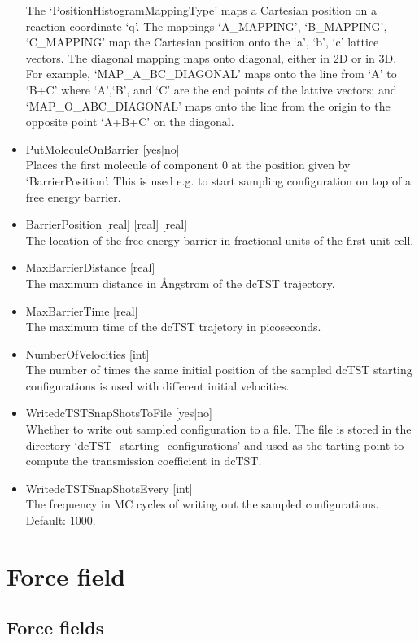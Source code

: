 \begin{itemize}
The `PositionHistogramMappingType' maps a Cartesian position on a reaction coordinate `q'.
The mappings `A\_MAPPING', `B\_MAPPING', `C\_MAPPING' map the Cartesian position onto the `a', `b', `c' lattice vectors.
The diagonal mapping maps onto diagonal, either in 2D or in 3D. For example, `MAP\_A\_BC\_DIAGONAL' maps onto the line from `A' to `B+C' where
`A',`B', and `C' are the end points of the lattive vectors; and `MAP\_O\_ABC\_DIAGONAL' maps onto the line from the origin to the opposite point `A+B+C' on the diagonal.
\item{PutMoleculeOnBarrier [yes$|$no]}\\
Places the first molecule of component 0 at the position given by `BarrierPosition'. This is used e.g. to start sampling configuration on top of a free energy barrier.
\item{BarrierPosition [real] [real] [real]}\\
The location of the free energy barrier in fractional units of the first unit cell.
\item{MaxBarrierDistance [real]}\\
The maximum distance in \AA ngstrom of the dcTST trajectory.
\item{MaxBarrierTime [real]}\\
The maximum time of the dcTST trajetory in picoseconds.
\item{NumberOfVelocities [int]}\\
The number of times the same initial position of the sampled dcTST starting configurations is used with different initial velocities.
\item{WritedcTSTSnapShotsToFile [yes$|$no]}\\
Whether to write out sampled configuration to a file. The file is stored in the directory `dcTST\_starting\_configurations' and used
as the tarting point to compute the transmission coefficient in dcTST.
\item{WritedcTSTSnapShotsEvery [int]}\\
The frequency in MC cycles of writing out the sampled configurations. Default: 1000.
\end{itemize}

\section{Force field}

\subsection{Force fields}

